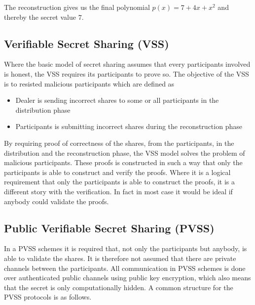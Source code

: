 \noindent
The reconstruction gives us the final polynomial $p(x)=7 + 4x+ x^2$ and thereby the secret value $7$.


\subsection{Verifiable Secret Sharing (VSS)}
Where the basic model of secret sharing assumes that every participants involved is honest, the VSS requires its participants to prove so. The objective of the VSS is to resisted malicious participants which are defined as \cite{Schoenmakers1999}

\begin{itemize}
    \item Dealer is sending incorrect shares to some or all participants in the distribution phase
    \item Participants is submitting incorrect shares during the reconstruction phase
\end{itemize}

\noindent 
By requiring proof of correctness of the shares, from the participants, in the distribution and the reconstruction phase, the VSS model solves the problem of malicious participants. These proofs is constructed in such a way that only the participants is able to construct and verify the proofs. Where it is a logical requirement that only the participants is able to construct the proofs, it is a different story with the verification. In fact in most case it would be ideal if anybody could validate the proofs. 


\subsection{Public Verifiable Secret Sharing (PVSS)}
In a PVSS schemes it is required that, not only the participants but anybody, is able to validate the shares. It is therefore not assumed that there are private channels between the participants. All communication in PVSS schemes  is done over authenticated public channels using public key encryption, which also means that the secret is only computationally hidden. A common structure for the PVSS protocols is as follows.

